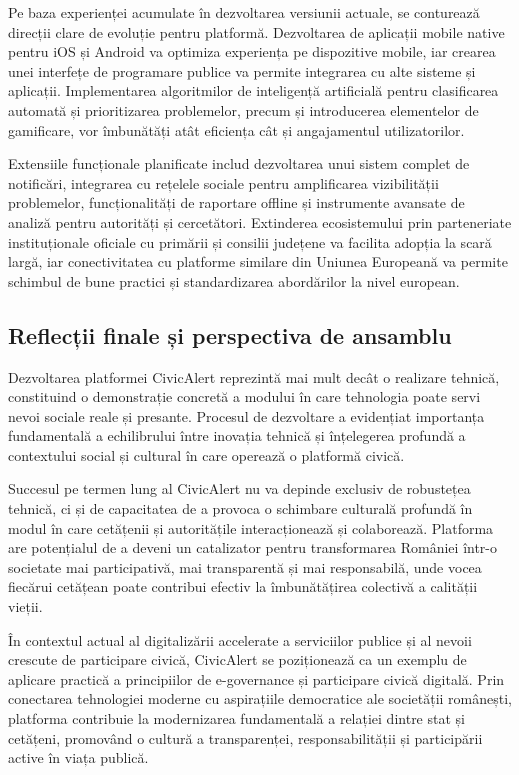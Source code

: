 \documentclass[12pt,a4paper]{report}
\begin{document}
Pe baza experienței acumulate în dezvoltarea versiunii actuale, se conturează direcții clare de evoluție pentru platformă. Dezvoltarea de aplicații mobile native pentru iOS și Android va optimiza experiența pe dispozitive mobile, iar crearea unei interfețe de programare publice va permite integrarea cu alte sisteme și aplicații. Implementarea algoritmilor de inteligență artificială pentru clasificarea automată și prioritizarea problemelor, precum și introducerea elementelor de gamificare, vor îmbunătăți atât eficiența cât și angajamentul utilizatorilor.

Extensiile funcționale planificate includ dezvoltarea unui sistem complet de notificări, integrarea cu rețelele sociale pentru amplificarea vizibilității problemelor, funcționalități de raportare offline și instrumente avansate de analiză pentru autorități și cercetători. Extinderea ecosistemului prin parteneriate instituționale oficiale cu primării și consilii județene va facilita adopția la scară largă, iar conectivitatea cu platforme similare din Uniunea Europeană va permite schimbul de bune practici și standardizarea abordărilor la nivel european.

\subsection{Reflecții finale și perspectiva de ansamblu}

Dezvoltarea platformei CivicAlert reprezintă mai mult decât o realizare tehnică, constituind o demonstrație concretă a modului în care tehnologia poate servi nevoi sociale reale și presante. Procesul de dezvoltare a evidențiat importanța fundamentală a echilibrului între inovația tehnică și înțelegerea profundă a contextului social și cultural în care operează o platformă civică.

Succesul pe termen lung al CivicAlert nu va depinde exclusiv de robustețea tehnică, ci și de capacitatea de a provoca o schimbare culturală profundă în modul în care cetățenii și autoritățile interacționează și colaborează. Platforma are potențialul de a deveni un catalizator pentru transformarea României într-o societate mai participativă, mai transparentă și mai responsabilă, unde vocea fiecărui cetățean poate contribui efectiv la îmbunătățirea colectivă a calității vieții.

În contextul actual al digitalizării accelerate a serviciilor publice și al nevoii crescute de participare civică, CivicAlert se poziționează ca un exemplu de aplicare practică a principiilor de e-governance și participare civică digitală. Prin conectarea tehnologiei moderne cu aspirațiile democratice ale societății românești, platforma contribuie la modernizarea fundamentală a relației dintre stat și cetățeni, promovând o cultură a transparenței, responsabilității și participării active în viața publică.
\end{document}
